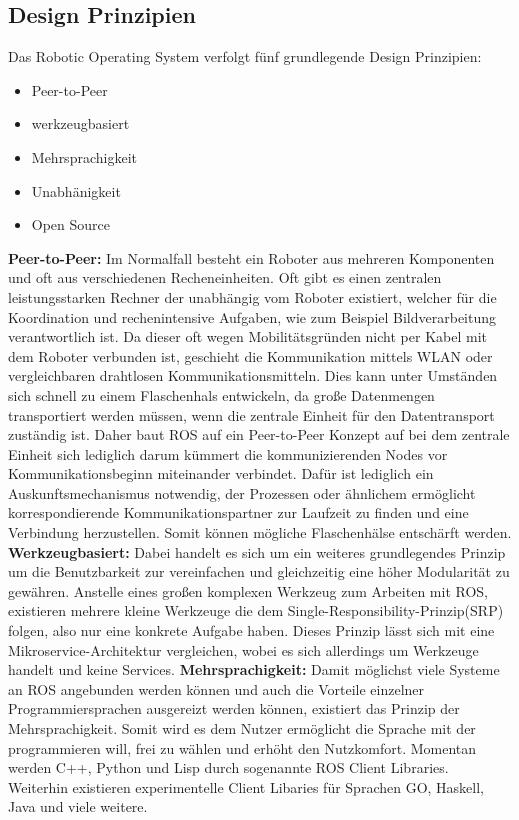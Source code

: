\subsection{Design Prinzipien}
Das Robotic Operating System verfolgt fünf grundlegende Design Prinzipien: 
\begin{itemize}
	\item Peer-to-Peer
	\item werkzeugbasiert
	\item Mehrsprachigkeit
	\item Unabhänigkeit
	\item Open Source
\end{itemize}
\textbf{Peer-to-Peer:} Im Normalfall besteht ein Roboter aus mehreren Komponenten und oft aus verschiedenen Recheneinheiten. Oft gibt es einen zentralen leistungsstarken Rechner der unabhängig vom Roboter existiert, welcher für die Koordination und rechenintensive Aufgaben, wie zum Beispiel Bildverarbeitung verantwortlich ist. Da dieser oft wegen Mobilitätsgründen nicht per Kabel mit dem Roboter verbunden ist, geschieht die Kommunikation mittels WLAN oder vergleichbaren drahtlosen Kommunikationsmitteln. Dies kann unter Umständen sich schnell zu einem Flaschenhals entwickeln, da große Datenmengen transportiert werden müssen, wenn die zentrale Einheit für den Datentransport zuständig ist. Daher baut ROS auf ein Peer-to-Peer Konzept auf bei dem zentrale Einheit sich lediglich darum kümmert die kommunizierenden Nodes vor Kommunikationsbeginn miteinander verbindet. Dafür ist lediglich ein Auskunftsmechanismus notwendig, der Prozessen oder ähnlichem ermöglicht korrespondierende Kommunikationspartner zur Laufzeit zu finden und eine Verbindung herzustellen. Somit können mögliche Flaschenhälse entschärft werden.\cite{rosbook}\cite{rosconcepts}\cite{rosprinc}\newline 
\textbf{Werkzeugbasiert:} Dabei handelt es sich um ein weiteres grundlegendes Prinzip um die Benutzbarkeit zur vereinfachen und gleichzeitig eine höher Modularität zu gewähren. Anstelle eines großen komplexen Werkzeug zum Arbeiten mit ROS, existieren mehrere kleine Werkzeuge die dem Single-Responsibility-Prinzip(SRP)\cite{singleresp} folgen, also nur eine konkrete Aufgabe haben. Dieses Prinzip lässt sich mit eine Mikroservice-Architektur vergleichen, wobei es sich allerdings um Werkzeuge handelt und keine Services.
\newline
\textbf{Mehrsprachigkeit:} Damit möglichst viele Systeme an ROS angebunden werden können und auch die Vorteile einzelner Programmiersprachen ausgereizt werden können, existiert das Prinzip der Mehrsprachigkeit. Somit wird es dem Nutzer ermöglicht die Sprache mit der programmieren will, frei zu wählen und erhöht den Nutzkomfort. Momentan werden C++, Python und Lisp durch sogenannte ROS Client Libraries. Weiterhin existieren experimentelle Client Libaries für Sprachen GO, Haskell, Java und viele weitere.\cite{clientlibary}
